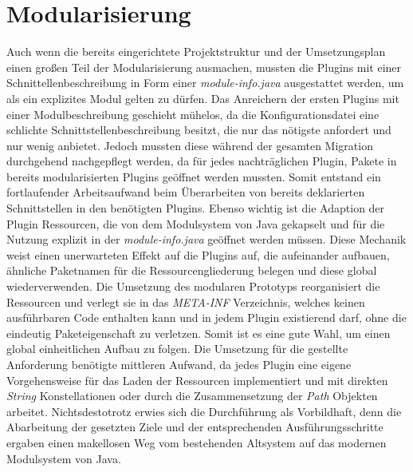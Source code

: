 \section{Modularisierung}
Auch wenn die bereits eingerichtete Projektstruktur und der Umsetzungsplan einen großen Teil der Modularisierung ausmachen, mussten die Plugins mit einer Schnittellenbeschreibung in Form einer \textit{module-info.java} ausgestattet werden, um als ein explizites Modul gelten zu dürfen. Das Anreichern der ersten Plugins mit einer Modulbeschreibung geschieht mühelos, da die Konfigurationsdatei eine schlichte Schnittstellenbeschreibung besitzt, die nur das nötigste anfordert und nur wenig anbietet. Jedoch mussten diese während der gesamten Migration durchgehend nachgepflegt werden, da für jedes nachträglichen Plugin, Pakete in bereits modularisierten Plugins geöffnet werden mussten. Somit entstand ein fortlaufender Arbeitsaufwand beim Überarbeiten von bereits deklarierten Schnittstellen in den benötigten Plugins.\newline
Ebenso wichtig ist die Adaption der Plugin Ressourcen, die von dem Modulsystem von Java gekapselt und für die Nutzung explizit in der \textit{module-info.java} geöffnet werden müssen. Diese Mechanik weist einen unerwarteten Effekt auf die Plugins auf, die aufeinander aufbauen, ähnliche Paketnamen für die Ressourcengliederung belegen und diese global wiederverwenden.\newline
Die Umsetzung des modularen Prototyps reorganisiert die Ressourcen und verlegt sie in das \textit{META-INF} Verzeichnis, welches keinen ausführbaren Code enthalten kann und in jedem Plugin existierend darf, ohne die eindeutig Paketeigenschaft zu verletzen. Somit ist es eine gute Wahl, um einen global einheitlichen Aufbau zu folgen. Die Umsetzung für die gestellte Anforderung benötigte mittleren Aufwand, da jedes Plugin eine eigene Vorgehensweise für das Laden der Ressourcen implementiert und mit direkten \textit{String} Konstellationen oder durch die Zusammensetzung der \textit{Path} Objekten arbeitet. \newline
Nichtsdestotrotz erwies sich die Durchführung als Vorbildhaft, denn die Abarbeitung der gesetzten Ziele und der entsprechenden Ausführungsschritte ergaben einen makellosen Weg vom bestehenden Altsystem auf das modernen Modulsystem von Java.\bigbreak

